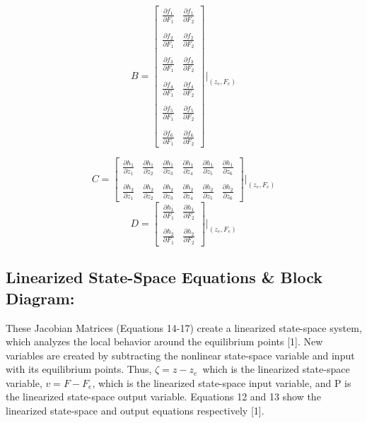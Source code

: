 \documentclass[conference]{IEEEtran}
\begin{document}
\[
B = 
\begin{bmatrix}
\frac{\partial f_1}{\partial F_1}&\frac{\partial f_1}{\partial F_2} \\\\
\frac{\partial f_2}{\partial F_1}&\frac{\partial f_2}{\partial F_2} \\\\
\frac{\partial f_3}{\partial F_1}&\frac{\partial f_3}{\partial F_2} \\\\
\frac{\partial f_4}{\partial F_1}&\frac{\partial f_4}{\partial F_2} \\\\
\frac{\partial f_5}{\partial F_1}&\frac{\partial f_5}{\partial F_2}\\\\
\frac{\partial f_6}{\partial F_1}&\frac{\partial f_6}{\partial F_2}
\end{bmatrix}
\Bigg|_{(z_e,F_e)} 
\tag{9}
\] 

\[
C = 
\begin{bmatrix}
\frac{\partial h_1}{\partial z_1}&\frac{\partial h_1}{\partial z_2}& \frac{\partial h_1}{\partial z_3}& \frac{\partial h_1}{\partial z_4}& \frac{\partial h_1}{\partial z_5} &\frac{\partial h_1}{\partial z_6}\\\\
\frac{\partial h_2}{\partial z_1}&\frac{\partial h_2}{\partial z_2}& \frac{\partial h_2}{\partial z_3}& \frac{\partial h_2}{\partial z_4}& \frac{\partial h_2}{\partial z_5} &\frac{\partial h_2}{\partial z_6}
\end{bmatrix}
\Bigg|_{(z_e,F_e)} 
\tag{10}
\] 
\[
D =
\begin{bmatrix}
\frac{\partial h_1}{\partial F_1}&\frac{\partial h_1}{\partial F_2} \\\\
\frac{\partial h_2}{\partial F_1}&\frac{\partial h_2}{\partial F_2}
\end{bmatrix}
\Bigg|_{(z_e,F_e)} 
\tag{11}
\] 

\newpage
\subsection{Linearized State-Space Equations \& Block Diagram:}
These Jacobian Matrices (Equations 14-17) create a linearized state-space system, which analyzes the local behavior around the equilibrium points [1]. New variables are created by subtracting the nonlinear state-space variable and input with its equilibrium points. Thus, $\zeta = z - z_e$\, which is the linearized state-space variable, $v = F - F_e$, which is the linearized state-space input variable, and P is the linearized state-space output variable. Equations 12 and 13 show the linearized state-space and output equations respectively [1].
\end{document}
